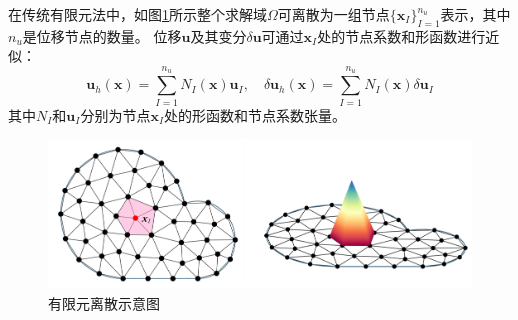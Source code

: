在传统有限元法中，如图\ref{fem}所示整个求解域$\Omega$可离散为一组节点$\{\boldsymbol x_I\}_{I=1}^{n_u}$表示\cite{hughes2000}，其中$n_u$是位移节点的数量。
位移$\boldsymbol u$及其变分$\delta \boldsymbol u $可通过$\boldsymbol x_I$处的节点系数和形函数进行近似：
\begin{equation}\label{u_h}
    \boldsymbol u_h(\boldsymbol x) = \sum_{I=1}^{n_u} N_I(\boldsymbol x) \boldsymbol u_I, \quad
    \delta \boldsymbol u_h(\boldsymbol x) = \sum_{I=1}^{n_u} N_I(\boldsymbol x) \delta \boldsymbol u_I
\end{equation}
其中$N_I$和$\boldsymbol u_I$分别为节点$\boldsymbol{x}_I$处的形函数和节点系数张量。
\begin{figure}[H]
    \centering 
        \includegraphics[scale=0.5]{figures/fem.png}
        \caption{有限元离散示意图}\label{fem}
\end{figure}

